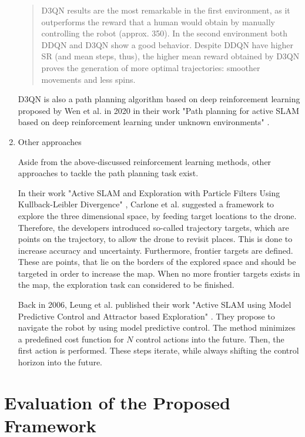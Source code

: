 \begin{enumerate}
\begin{quote}
	D3QN results are the most remarkable in the first environment, as it
outperforms the reward that a human would obtain by manually controlling the robot (approx. 350). In the
second environment both DDQN and D3QN show a good behavior. Despite DDQN have higher SR
(and mean steps, thus), the higher mean reward obtained by D3QN proves the generation of more
optimal trajectories: smoother movements and less spins. \cite{deep}
	\end{quote}
	D3QN is also a path planning algorithm based on deep reinforcement learning proposed by Wen et al. in 2020 in their work "Path planning for 
	active SLAM based on deep reinforcement learning under unknown environments" \cite{accurat}.
	
	\item{Other approaches}
	
	Aside from the above-discussed reinforcement learning methods, other approaches to tackle the path planning task exist. 
	
	In their work "Active SLAM and Exploration with Particle Filters Using Kullback-Leibler Divergence" \cite{ppap1}, Carlone et al. suggested a framework to 
	explore the three dimensional space, by feeding target locations to the drone. Therefore, the developers introduced so-called trajectory targets, which 
	are points on the trajectory, to allow the drone to revisit places. This is done to increase accuracy and uncertainty. Furthermore, frontier targets 
	are defined. These are points, that lie on the borders of the explored space and should be targeted in order to increase the map. When no more frontier 
	targets exists in the map, the exploration task can considered to be finished. 
	
	Back in 2006, Leung et al. published their work "Active SLAM using Model Predictive Control and Attractor based Exploration" \cite{ppap2}. They propose to navigate
	the robot by using model predictive control. The method minimizes a predefined cost function for $N$ control actions into the future. Then, the first action 
	is performed. These steps iterate, while always shifting the control horizon into the future. 

	
	\end{enumerate}
	
	
	\section{Evaluation of the Proposed Framework}
		
